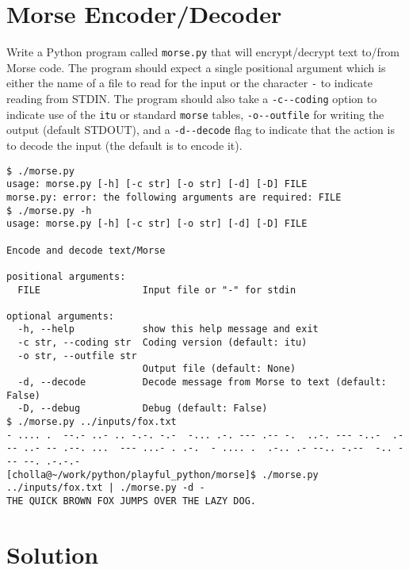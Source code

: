 \documentclass[]{article}
\begin{document}
\hypertarget{morse-encoderdecoder}{%
\section{Morse Encoder/Decoder}\label{morse-encoderdecoder}}

Write a Python program called \texttt{morse.py} that will
encrypt/decrypt text to/from Morse code. The program should expect a
single positional argument which is either the name of a file to read
for the input or the character \texttt{-} to indicate reading from
STDIN. The program should also take a \texttt{-c\textbar{}-\/-coding}
option to indicate use of the \texttt{itu} or standard \texttt{morse}
tables, \texttt{-o\textbar{}-\/-outfile} for writing the output (default
STDOUT), and a \texttt{-d\textbar{}-\/-decode} flag to indicate that the
action is to decode the input (the default is to encode it).

\begin{verbatim}
$ ./morse.py
usage: morse.py [-h] [-c str] [-o str] [-d] [-D] FILE
morse.py: error: the following arguments are required: FILE
$ ./morse.py -h
usage: morse.py [-h] [-c str] [-o str] [-d] [-D] FILE

Encode and decode text/Morse

positional arguments:
  FILE                  Input file or "-" for stdin

optional arguments:
  -h, --help            show this help message and exit
  -c str, --coding str  Coding version (default: itu)
  -o str, --outfile str
                        Output file (default: None)
  -d, --decode          Decode message from Morse to text (default: False)
  -D, --debug           Debug (default: False)
$ ./morse.py ../inputs/fox.txt
- .... .  --.- ..- .. -.-. -.-  -... .-. --- .-- -.  ..-. --- -..-  .--- ..- -- .--. ...  --- ...- . .-.  - .... .  .-.. .- --.. -.--  -.. --- --. .-.-.-
[cholla@~/work/python/playful_python/morse]$ ./morse.py ../inputs/fox.txt | ./morse.py -d -
THE QUICK BROWN FOX JUMPS OVER THE LAZY DOG.
\end{verbatim}

\pagebreak

\hypertarget{solution-25}{%
\section{Solution}\label{solution-25}}
\end{document}
